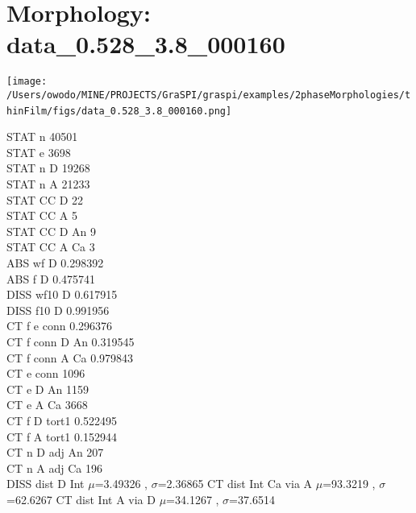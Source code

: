 \documentclass{article}
\begin{document}
\section{Morphology: data\_0.528\_3.8\_000160 }
\parbox{0.35\textwidth}{
\texttt{[image: /Users/owodo/MINE/PROJECTS/GraSPI/graspi/examples/2phaseMorphologies/thinFilm/figs/data\_0.528\_3.8\_000160.png]} \  
 ~\newline ~\newline 
\begin{small}
STAT n 40501\\
STAT e 3698\\
STAT n D 19268\\
STAT n A 21233\\
STAT CC D 22\\
STAT CC A 5\\
STAT CC D An 9\\
STAT CC A Ca 3\\
ABS wf D 0.298392\\
ABS f D 0.475741\\
DISS wf10 D 0.617915\\
DISS f10 D 0.991956\\
CT f e conn 0.296376\\
CT f conn D An 0.319545\\
CT f conn A Ca 0.979843\\
CT e conn 1096\\
CT e D An 1159\\
CT e A Ca 3668\\
CT f D tort1 0.522495\\
CT f A tort1 0.152944\\
CT n D adj An 207\\
CT n A adj Ca 196\\

DISS dist D Int $\mu$=3.49326 , $\sigma$=2.36865 \newline
CT dist Int Ca via A $\mu$=93.3219 , $\sigma$=62.6267 \newline
CT dist Int A via D $\mu$=34.1267 , $\sigma$=37.6514 \newline
\end{small}
}
\end{document}
